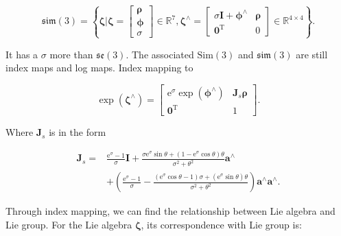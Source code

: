 \begin{equation}
\mathfrak{sim} \left( 3 \right) = \left\{ { \boldsymbol{\zeta} | \boldsymbol{\zeta}  = \left[ \begin{array}{l}
	\boldsymbol{\rho} \\
	\boldsymbol{\phi} \\
	\sigma
	\end{array} \right] \in { \mathbb{R}^7},{ \boldsymbol{\zeta} ^ \wedge } = \left[ {\begin{array}{*{20}{c}}
		{\sigma \bm{I} + {\boldsymbol{\phi} ^ \wedge }}&\boldsymbol{\rho} \\
		{{\bm{0}^\mathrm{T}}}&0
		\end{array}} \right] \in {\mathbb{R}^{4 \times 4}}} \right\}.
\end{equation}

It has a $\sigma$ more than $\mathfrak{se}(3)$. The associated $\mathrm{Sim}(3)$ and $\mathfrak{sim}(3)$ are still index maps and log maps. Index mapping to

\begin{equation}
\exp \left( {{ \boldsymbol{\zeta} ^ \wedge }} \right) = \left[ {\begin{array}{*{20}{c}}
	{{\mathrm{e}^\sigma }\exp \left( {{ \boldsymbol{\phi} ^ \wedge }} \right)}&{ \bm{J}_s \boldsymbol{\rho} }\\
	{{\bm{0}^\mathrm{T}}}&1
	\end{array}} \right].
\end{equation}

Where $\bm{J}_s$ is in the form

\begin{align*}
{ \bm{J}_s} =& \frac{{{\mathrm{e}^\sigma } - 1}}{\sigma } \bm{I} + \frac{ \sigma {{\mathrm{e}^\sigma }\sin \theta  + \left( {1 - {\mathrm{e}^\sigma }\cos \theta } \right)\theta }}{{{\sigma ^2} + {\theta ^2}}}{\bm{a}^ \wedge }\\
&+ \left( {\frac{{{\mathrm{e}^\sigma } - 1}}{\sigma } - \frac{{\left( {{\mathrm{e}^\sigma }\cos \theta  - 1} \right)\sigma  + ({\mathrm{e}^\sigma }\sin \theta )\theta }}{{{\sigma ^2} + {\theta ^2}}}} \right){\bm{a}^ \wedge }{\bm{a}^ \wedge }.
\end{align*}

Through index mapping, we can find the relationship between Lie algebra and Lie group. For the Lie algebra $\boldsymbol{\zeta}$, its correspondence with Lie group is:

